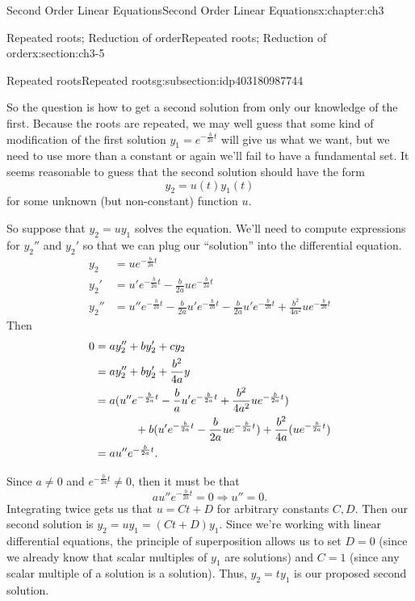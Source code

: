 \documentclass[oneside,10pt,]{book}
\numberwithin{equation}{section}
\numberwithin{equation}{section}
\newcommand{\amp}{&}
\begin{document}
\begin{chapterptx}{Second Order Linear Equations}{}{Second Order Linear Equations}{}{}{x:chapter:ch3}
\begin{sectionptx}{Repeated roots; Reduction of order}{}{Repeated roots; Reduction of order}{}{}{x:section:ch3-5}
\begin{subsectionptx}{Repeated roots}{}{Repeated roots}{}{}{g:subsection:idp403180987744}
\par
So the question is how to get a second solution from only our knowledge of the first. Because the roots are repeated, we may well guess that some kind of modification of the first solution \(y_1 = e^{-\frac{b}{2a} t}\) will give us what we want, but we need to use more than a constant or again we'll fail to have a fundamental set. It seems reasonable to guess that the second solution should have the form%
\begin{equation*}
y_2 = u(t) y_1(t)
\end{equation*}
for some unknown (but non-constant) function \(u\).%
\par
So suppose that \(y_2 = u y_1\) solves the equation. We'll need to compute expressions for \(y_2''\) and \(y_2'\) so that we can plug our ``solution'' into the differential equation.%
\begin{align*}
y_2 \amp= u e^{-\frac{b}{2a}t}\\
y_2' \amp= u' e^{-\frac{b}{2a}t} -\frac{b}{2a} u e^{-\frac{b}{2a}t}\\
y_2'' \amp= u'' e^{-\frac{b}{2a} t} - \frac{b}{2a} u' e^{-\frac{b}{2a}t} - \frac{b}{2a} u' e^{-\frac{b}{2a}t} + \frac{b^2}{4a^2} u e^{-\frac{b}{2a}t}
\end{align*}
Then%
\begin{align*}
0 \amp= ay_2'' + b y_2' + cy_2\\
\amp= ay_2'' + by_2' + \frac{b^2}{4a}y\\
\amp= a(u'' e^{-\frac{b}{2a} t} - \frac{b}{a} u' e^{-\frac{b}{2a}t} + \frac{b^2}{4a^2} u e^{-\frac{b}{2a}t})\\
\amp\hspace{.5in} + b(u' e^{-\frac{b}{2a}t} -\frac{b}{2a} u e^{-\frac{b}{2a}t}) + \frac{b^2}{4a}(u e^{-\frac{b}{2a}t})\\
\amp = a u'' e^{-\frac{b}{2a}t}.
\end{align*}
%
\par
Since \(a \neq 0\) and \(e^{-\frac{b}{2a}t} \neq 0\), then it must be that%
\begin{equation*}
a u'' e^{-\frac{b}{2a} t} = 0 \Rightarrow u'' = 0.
\end{equation*}
Integrating twice gets us that \(u = Ct + D\) for arbitrary constants \(C, D\). Then our second solution is \(y_2 = u y_1 = (Ct + D)y_1\). Since we're working with linear differential equations, the principle of superposition allows us to set \(D = 0\) (since we already know that scalar multiples of \(y_1\) are solutions) and \(C = 1\) (since any scalar multiple of a solution is a solution). Thus, \(y_2 = t y_1\) is our proposed second solution.%

\end{subsectionptx}
\end{sectionptx}
\end{chapterptx}
\end{document}
